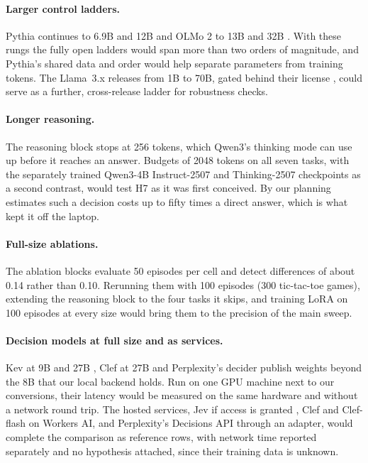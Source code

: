 \paragraph{Larger control ladders.}
Pythia continues to 6.9B and 12B \citep{biderman2023pythia} and OLMo 2 to 13B and 32B \citep{olmo2025olmo2}. With these rungs the fully open ladders would span more than two orders of magnitude, and Pythia's shared data and order would help separate parameters from training tokens. The Llama~3.x releases from 1B to 70B, gated behind their license \citep{meta2025llamamodels}, could serve as a further, cross-release ladder for robustness checks.

\paragraph{Longer reasoning.}
The reasoning block stops at 256 tokens, which Qwen3's thinking mode can use up before it reaches an answer. Budgets of 2048 tokens on all seven tasks, with the separately trained Qwen3-4B Instruct-2507 and Thinking-2507 checkpoints as a second contrast, would test H7 as it was first conceived. By our planning estimates such a decision costs up to fifty times a direct answer, which is what kept it off the laptop.

\paragraph{Full-size ablations.}
The ablation blocks evaluate 50 episodes per cell and detect differences of about 0.14 rather than 0.10. Rerunning them with 100 episodes (300 tic-tac-toe games), extending the reasoning block to the four tasks it skips, and training LoRA on 100 episodes at every size would bring them to the precision of the main sweep.

\paragraph{Decision models at full size and as services.}
Kev at 9B and 27B \citep{palmer2026kev}, Clef at 27B \citep{cloudflare2026clef} and Perplexity's decider \citep{perplexity2026decider} publish weights beyond the 8B that our local backend holds. Run on one GPU machine next to our conversions, their latency would be measured on the same hardware and without a network round trip. The hosted services, Jev if access is granted \citep{typesafe2026jev}, Clef and Clef-flash on Workers AI, and Perplexity's Decisions API through an adapter, would complete the comparison as reference rows, with network time reported separately and no hypothesis attached, since their training data is unknown.

